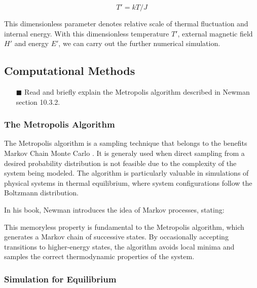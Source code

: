 \documentclass[11pt]{article}
\begin{document}
\begin{equation}
    T' = kT/J
\end{equation}

This dimensionless parameter denotes relative scale of thermal fluctuation and internal energy. With this dimensionless temperature $T'$, external magnetic field $H'$ and energy $E'$, we can carry out the further numerical simulation.

\subsection{Computational Methods}
\begin{itemize}
    \item[$\blacksquare$] Read and briefly explain the Metropolis algorithm described in Newman section 10.3.2.
\end{itemize}

\subsubsection*{The Metropolis Algorithm}

The Metropolis algorithm is a sampling technique that belongs to the benefits Markov Chain Monte Carlo . It is generaly used when direct sampling from a desired probability distribution is not feasible due to the complexity of the system being modeled. The algorithm is particularly valuable in simulations of physical systems in thermal equilibrium, where system configurations follow the Boltzmann distribution.

In his book, Newman introduces the idea of Markov processes, stating:

\textit{} \cite{newman1999}

This memoryless property is fundamental to the Metropolis algorithm, which generates a Markov chain of successive states. By occasionally accepting transitions to higher-energy states, the algorithm avoids local minima and samples the correct thermodynamic properties of the system.

\subsubsection*{Simulation for Equilibrium}
\end{document}
